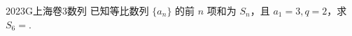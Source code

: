 
\begin{problem}{2023}{G}{上海卷}{3}{数列}
已知等比数列 $\{a_n\}$ 的前 $n$ 项和为 $S_n$，且 $a_1=3, q=2$，求 $S_6=$\underline{\hspace{4em}}.
\end{problem}